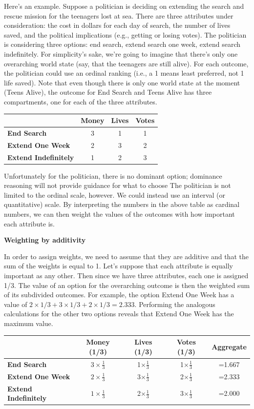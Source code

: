 \documentclass[]{tufte-book}
\begin{document}
Here's an example. Suppose a politician is deciding on extending the search and rescue mission for the teenagers lost at sea. There are three attributes under consideration: the cost in dollars for each day of search, the number of lives saved, and the political implications (e.g., getting or losing votes). The politician is considering three options: end search, extend search one week, extend search indefinitely. For simplicity's sake, we're going to imagine that there's only one overarching world state (say, that the teenagers are still alive). For each outcome, the politician could use an ordinal ranking (i.e., a 1 means least preferred, not 1 life saved). Note that even though there is only one world state at the moment (Teens Alive), the outcome for End Search and Teens Alive has three compartments, one for each of the three attributes.

\begin{longtable}[]{@{}lccc@{}}
\toprule
& Money & Lives & Votes\tabularnewline
\midrule
\endhead
\textbf{End Search} & 3 & 1 & 1\tabularnewline
\textbf{Extend One Week} & 2 & 3 & 2\tabularnewline
\textbf{Extend Indefinitely} & 1 & 2 & 3\tabularnewline
\bottomrule
\end{longtable}

Unfortunately for the politician, there is no dominant option; dominance reasoning will not provide guidance for what to choose
The politician is not limited to the ordinal scale, however. We could instead use an interval (or quantitative) scale. By interpreting the numbers in the above table as cardinal numbers, we can then weight the values of the outcomes with how important each attribute is.

\textbf{Weighting by additivity}

In order to assign weights, we need to assume that they are additive and that the sum of the weights is equal to 1. Let's suppose that each attribute is equally important as any other. Then since we have three attributes, each one is assigned 1/3. The value of an option for the overarching outcome is then the weighted sum of its subdivided outcomes. For example, the option Extend One Week has a value of \(2\times 1/3 + 3 \times 1/3 + 2 \times 1/3 = 2.333\). Performing the analogous calculations for the other two options reveals that Extend One Week has the maximum value.

\begin{longtable}[]{@{}lcccc@{}}
\toprule
& Money (1/3) & Lives (1/3) & Votes (1/3) & Aggregate\tabularnewline
\midrule
\endhead
\textbf{End Search} & \(3\times \frac{1}{3}\) & 1\(\times \frac{1}{3}\) & 1\(\times \frac{1}{3}\) & =1.667\tabularnewline
\textbf{Extend One Week} & \(2\times \frac{1}{3}\) & 3\(\times \frac{1}{3}\) & 2\(\times \frac{1}{3}\) & =2.333\tabularnewline
\textbf{Extend Indefinitely} & \(1\times \frac{1}{3}\) & 2\(\times \frac{1}{3}\) & 3\(\times \frac{1}{3}\) & =2.000\tabularnewline
\bottomrule
\end{longtable}
\end{document}
